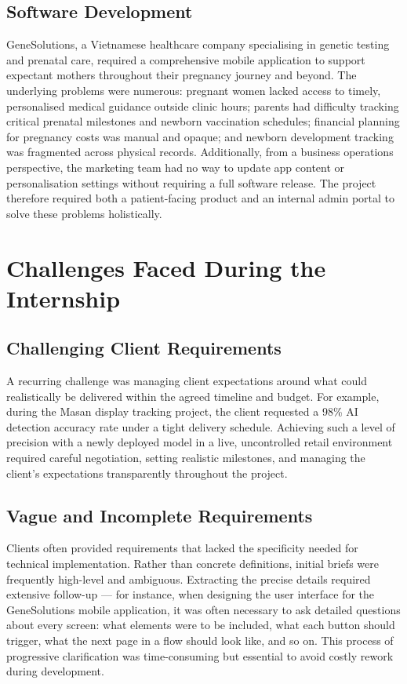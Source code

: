 \subsection{Software Development}

GeneSolutions, a Vietnamese healthcare company specialising in genetic testing and prenatal care, required a comprehensive mobile application to support expectant mothers throughout their pregnancy journey and beyond. The underlying problems were numerous: pregnant women lacked access to timely, personalised medical guidance outside clinic hours; parents had difficulty tracking critical prenatal milestones and newborn vaccination schedules; financial planning for pregnancy costs was manual and opaque; and newborn development tracking was fragmented across physical records. Additionally, from a business operations perspective, the marketing team had no way to update app content or personalisation settings without requiring a full software release. The project therefore required both a patient-facing product and an internal admin portal to solve these problems holistically.

\section{Challenges Faced During the Internship}

\subsection{Challenging Client Requirements}

A recurring challenge was managing client expectations around what could realistically be delivered within the agreed timeline and budget. For example, during the Masan display tracking project, the client requested a 98\% AI detection accuracy rate under a tight delivery schedule. Achieving such a level of precision with a newly deployed model in a live, uncontrolled retail environment required careful negotiation, setting realistic milestones, and managing the client's expectations transparently throughout the project.

\subsection{Vague and Incomplete Requirements}

Clients often provided requirements that lacked the specificity needed for technical implementation. Rather than concrete definitions, initial briefs were frequently high-level and ambiguous. Extracting the precise details required extensive follow-up — for instance, when designing the user interface for the GeneSolutions mobile application, it was often necessary to ask detailed questions about every screen: what elements were to be included, what each button should trigger, what the next page in a flow should look like, and so on. This process of progressive clarification was time-consuming but essential to avoid costly rework during development.

